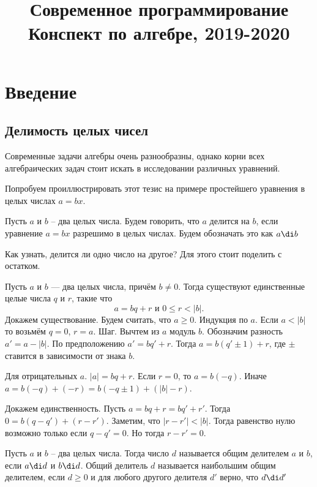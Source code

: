 



\title{Современное программирование \\ 
Конспект по алгебре, 2019-2020}
\date{}




\tableofcontents

\chapter{Введение}

\section{Делимость целых чисел}
Современные задачи алгебры очень разнообразны, однако корни всех алгебраических задач стоит искать в исследовании различных уравнений.


Попробуем проиллюстрировать этот тезис на примере простейшего уравнения в целых числах $a=bx$.

\dfn[Делимость] Пусть $a$ и $b$ -- два целых числа. Будем говорить, что $a$ делится на $b$, если уравнение $a=bx$ разрешимо в целых числах. Будем обозначать это как $a\di b$ 
\edfn

Как узнать, делится ли одно число на другое? Для этого стоит поделить с остатком.

 Пусть $a$ и $b$ --- два целых числа, причём $b\neq 0$. Тогда существуют единственные целые
числа $q$ и $r$, такие что
$$a=bq+r \text{ и } 0\leq r< |b|.$$
\ethrm
\proof Докажем существование. Будем считать, что $a\geq 0$. Индукция по $a$. Если $a<|b|$  то возьмём $q=0$, $r=a$. Шаг. Вычтем из $a$ модуль $b$. Обозначим разность $a'=a-|b|$. По предположению $a'=bq'+r$. Тогда $a=b(q'\pm 1)+r$, где $\pm$ ставится в зависимости от знака $b$. 

Для отрицательных $a$. $|a|=bq+r$. Если $r=0$, то $a=b(-q)$.  Иначе $a=b(-q)+(-r)=b(-q\pm 1)+(|b|-r)$.

Докажем единственность. Пусть $a=bq+r=bq'+r'$. Тогда $0=b(q-q')+(r-r')$. Заметим, что $|r-r'|<|b|$. Тогда равенство нулю возможно только если $q-q'=0$. Но тогда $r-r'=0$.
\endproof




 Пусть $a$ и $b$ -- два целых числа. Тогда число $d$ называется общим делителем $a$ и $b$, если $a\di  d $ и $b \di d$.
Общий делитель $d$ называется наибольшим общим делителем, если $d\geq 0$  и для любого другого делителя $d'$ верно, что $d \di d'$
\edfn

